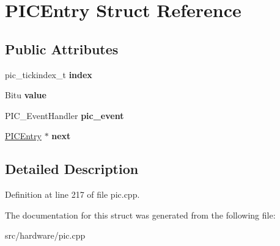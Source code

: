 \hypertarget{structPICEntry}{\section{P\-I\-C\-Entry Struct Reference}
\label{structPICEntry}
}
\subsection*{Public Attributes}
\begin{DoxyCompactItemize}
\item 
\hypertarget{structPICEntry_a6253dbeb4602fe1c76213bc9dcfc6f82}{pic\-\_\-tickindex\-\_\-t {\bfseries index}}\label{structPICEntry_a6253dbeb4602fe1c76213bc9dcfc6f82}

\item 
\hypertarget{structPICEntry_aa24da36d5183c48d36d262f9861b1371}{Bitu {\bfseries value}}\label{structPICEntry_aa24da36d5183c48d36d262f9861b1371}

\item 
\hypertarget{structPICEntry_a1d7e2902f11b356f977faaf6e8f9a5c3}{P\-I\-C\-\_\-\-Event\-Handler {\bfseries pic\-\_\-event}}\label{structPICEntry_a1d7e2902f11b356f977faaf6e8f9a5c3}

\item 
\hypertarget{structPICEntry_a45ff9b7aee4f5401e5d79b0595d818e4}{\hyperlink{structPICEntry}{P\-I\-C\-Entry} $\ast$ {\bfseries next}}\label{structPICEntry_a45ff9b7aee4f5401e5d79b0595d818e4}

\end{DoxyCompactItemize}


\subsection{Detailed Description}


Definition at line 217 of file pic.\-cpp.



The documentation for this struct was generated from the following file\-:\begin{DoxyCompactItemize}
\item 
src/hardware/pic.\-cpp\end{DoxyCompactItemize}
